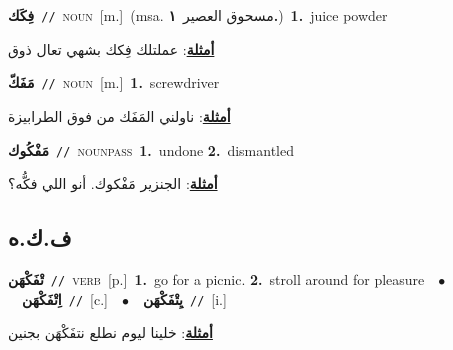 \documentclass[10pt,a4paper,twoside]{article} %
\begin{document}
\begin{multicols}{2}
{\setlength\topsep{0pt}\textbf{\foreignlanguage{arabic}{فِكَك}}\ {\color{gray}\texttt{//}\color{black}}\ \textsc{noun}\ [m.]\ \color{gray}(msa. \foreignlanguage{arabic}{مسحوق العصير}~\foreignlanguage{arabic}{\textbf{١.}})\color{black}\ \textbf{1.}~juice powder\  \begin{flushright}\color{gray}\foreignlanguage{arabic}{\textbf{\underline{\foreignlanguage{arabic}{أمثلة}}}: عملتلك فِكك بشهي تعال ذوق}\end{flushright}\color{black}} \vspace{2mm}

{\setlength\topsep{0pt}\textbf{\foreignlanguage{arabic}{مَفَكّ}}\ {\color{gray}\texttt{//}\color{black}}\ \textsc{noun}\ [m.]\ \textbf{1.}~screwdriver\  \begin{flushright}\color{gray}\foreignlanguage{arabic}{\textbf{\underline{\foreignlanguage{arabic}{أمثلة}}}: ناولني المَفَك من فوق الطرابيزة}\end{flushright}\color{black}} \vspace{2mm}

{\setlength\topsep{0pt}\textbf{\foreignlanguage{arabic}{مَفْكُوك}}\ {\color{gray}\texttt{//}\color{black}}\ \textsc{noun\textunderscore pass}\ \textbf{1.}~undone  \textbf{2.}~dismantled\  \begin{flushright}\color{gray}\foreignlanguage{arabic}{\textbf{\underline{\foreignlanguage{arabic}{أمثلة}}}: الجنزير مَفْكوك. أنو اللي فكُّه؟}\end{flushright}\color{black}} \vspace{2mm}

\vspace{-3mm}
\subsection*{\color{blue}\foreignlanguage{arabic}{ف.ك.ه}\color{blue}{}} 

{\setlength\topsep{0pt}\textbf{\foreignlanguage{arabic}{تْفَكْهَن}}\ {\color{gray}\texttt{//}\color{black}}\ \textsc{verb}\ [p.]\ \textbf{1.}~go for a picnic.  \textbf{2.}~stroll around for pleasure\ \ $\bullet$\ \ \setlength\topsep{0pt}\textbf{\foreignlanguage{arabic}{اِتْفَكْهَن}}\ {\color{gray}\texttt{//}\color{black}}\ [c.]\ \ $\bullet$\ \ \setlength\topsep{0pt}\textbf{\foreignlanguage{arabic}{يِتْفَكْهَن}}\ {\color{gray}\texttt{//}\color{black}}\ [i.]\  \begin{flushright}\color{gray}\foreignlanguage{arabic}{\textbf{\underline{\foreignlanguage{arabic}{أمثلة}}}: خلينا ليوم نطلع نتفَكْهَن بجنين}\end{flushright}\color{black}} \vspace{2mm}


\end{multicols}
\end{document}
